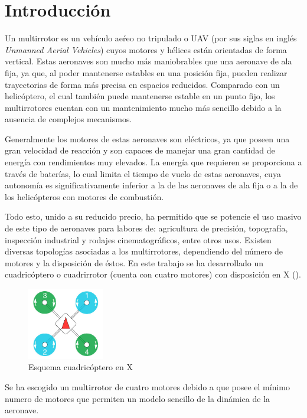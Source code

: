 \chapter{Introducción}

Un multirrotor es un vehículo aeŕeo no tripulado o UAV (por sus siglas en inglés \textit{Unmanned Aerial Vehicles}) cuyos motores y hélices están orientadas de forma vertical. Estas aeronaves son mucho más maniobrables que una aeronave de ala fija, ya que, al poder mantenerse estables en una posición fija, pueden realizar trayectorias de forma más precisa en espacios reducidos. Comparado con un helicóptero, el cual también puede mantenerse estable en un punto fijo, los multirrotores cuentan con un mantenimiento mucho más sencillo debido a la ausencia de complejos mecanismos.

Generalmente los motores de estas aeronaves son eléctricos, ya que poseen una gran velocidad de reacción y son capaces de manejar una gran cantidad de energía con rendimientos muy elevados. La energía que requieren se proporciona a través de baterías, lo cual limita el tiempo de vuelo de estas aeronaves, cuya autonomía es significativamente inferior a la de las aeronaves de ala fija o a la de los helicópteros con motores de combustión.

Todo esto, unido a su reducido precio, ha permitido que se potencie el uso masivo de este tipo de aeronaves para labores de: agricultura de precisión, topografía, inspección industrial y rodajes cinematográficos, entre otros usos. Existen diversas topologías asociadas a los multirrotores, dependiendo del número de motores y la disposición de éstos. En este trabajo se ha desarrollado un cuadricóptero o cuadrirrotor (cuenta con cuatro motores) con disposición en X ().

\begin{figure}[htb!]
		\centering
		\includegraphics[width=0.3\textwidth]{introduccion/cuadrirrotorX.jpeg}
		\caption{Esquema cuadricóptero en X}
		\label{Drone_en_X}
	\end{figure}

Se ha escogido un multirrotor de cuatro motores debido a que posee el mínimo numero de motores que permiten un modelo sencillo de la dinámica de la aeronave.

